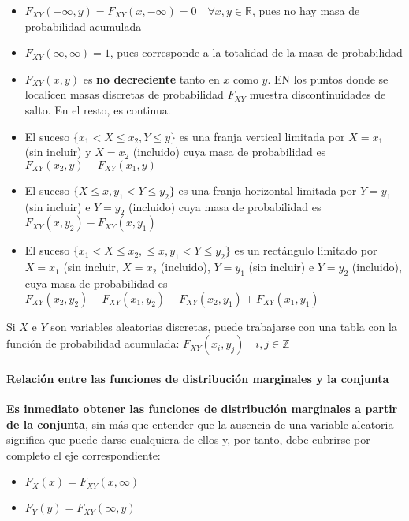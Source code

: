 \documentclass[11pt]{article}
\providecommand{\tightlist}{%
      \setlength{\itemsep}{0pt}\setlength{\parskip}{0pt}}
\begin{document}
\begin{itemize}
\tightlist
\item
  \(F_{XY}(-\infty, y) = F_{XY}(x, -\infty) = 0 \quad \forall x,y \in \mathbb{R}\),
  pues no hay masa de probabilidad acumulada
\item
  \(F_{XY}(\infty, \infty) = 1\), pues corresponde a la totalidad de la
  masa de probabilidad
\item
  \(F_{XY}(x,y)\) es \textbf{no decreciente} tanto en \(x\) como \(y\).
  EN los puntos donde se localicen masas discretas de probabilidad
  \(F_{XY}\) muestra discontinuidades de salto. En el resto, es
  continua.
\item
  El suceso \(\{x_1 < X \leq x_2, Y \leq y\}\) es una franja vertical
  limitada por \(X=x_1\) (sin incluir) y \(X=x_2\) (incluido) cuya masa
  de probabilidad es \(F_{XY}(x_2,y)-F_{XY}(x_1,y)\)
\item
  El suceso \(\{X \leq x, y_1 < Y \leq y_2\}\) es una franja horizontal
  limitada por \(Y=y_1\) (sin incluir) e \(Y=y_2\) (incluido) cuya masa
  de probabilidad es \(F_{XY}(x,y_2)-F_{XY}(x,y_1)\)
\item
  El suceso \(\{x_1 <X\leq x_2 , \leq x, y_1 < Y \leq y_2\}\) es un
  rectángulo limitado por \(X=x_1\) (sin incluir, \(X=x_2\) (incluido),
  \(Y=y_1\) (sin incluir) e \(Y=y_2\) (incluido), cuya masa de
  probabilidad es
  \(F_{XY}(x_2,y_2)-F_{XY}(x_1,y_2)-F_{XY}(x_2,y_1)+F_{XY}(x_1,y_1)\)
\end{itemize}

Si \(X\) e \(Y\) son variables aleatorias discretas, puede trabajarse
con una tabla con la función de probabilidad acumulada:
\(F_{XY}(x_i, y_j) \quad i,j \in \mathbb{Z}\)

    \hypertarget{relaciuxf3n-entre-las-funciones-de-distribuciuxf3n-marginales-y-la-conjunta}{%
\paragraph{Relación entre las funciones de distribución marginales y la
conjunta}\label{relaciuxf3n-entre-las-funciones-de-distribuciuxf3n-marginales-y-la-conjunta}}

\textbf{Es inmediato obtener las funciones de distribución marginales a
partir de la conjunta}, sin más que entender que la ausencia de una
variable aleatoria significa que puede darse cualquiera de ellos y, por
tanto, debe cubrirse por completo el eje correspondiente:

\begin{itemize}
\tightlist
\item
  \(F_X(x) = F_{XY}(x,\infty)\)
\item
  \(F_Y(y) = F_{XY}(\infty , y)\)
\end{itemize}
\end{document}
